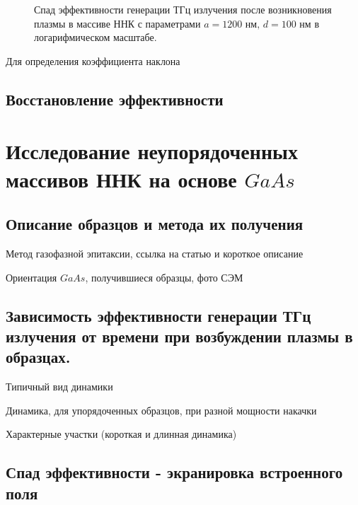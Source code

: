 \documentclass[a4paper,14pt,russian]{extreport}
\begin{document}
				\begin{figure}[h!]
					\caption{Спад эффективности генерации ТГц излучения после возникновения плазмы в массиве ННК с параметрами $a = 1200 \text{ нм, } d = 100 \text{ нм}$ в логарифмическом масштабе.}
				\label{ris:shortLog1200100}
				\end{figure}
				Для определения коэффициента наклона 
			\subsection{Восстановление эффективности}
		\section{Исследование неупорядоченных массивов ННК на основе $GaAs$}
			\subsection{Описание образцов и метода их получения}
				Метод газофазной эпитаксии, ссылка на
				статью и короткое описание\par
				Ориентация $GaAs$, получившиеся образцы,
				фото СЭМ
			\newpage
			\subsection{Зависимость эффективности генерации ТГц излучения от времени при возбуждении плазмы в образцах.}
				Типичный вид динамики\par
				Динамика, для упорядоченных образцов,
				при разной мощности накачки\par
				Характерные участки (короткая и длинная
				динамика)\par
			\subsection{Спад эффективности - экранировка встроенного поля}
\end{document}

